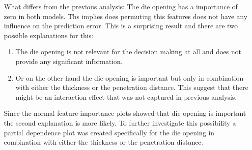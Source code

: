 What differs from the previous analysis: The die opening has a importance of zero in both models.
Ths implies does permuting this features does not have any influence on the prediction error.
This is a surprising result and there are two possible explanations for this:
\begin{enumerate}
    \item The die opening is not relevant for the decision making at all and does not provide any
    significant information.
    \item Or on the other hand the die opening is important but only in combination with either the thickness or the
    penetration distance.
    This suggest that there might be an interaction effect that was not captured in previous analysis.
\end{enumerate}

Since the normal feature importance plots showed that die opening is important the second explanation is more
likely.
To further investigate this possibility a partial dependence plot was created specifically for the die opening in
combination with either the thickness or the penetration distance.


